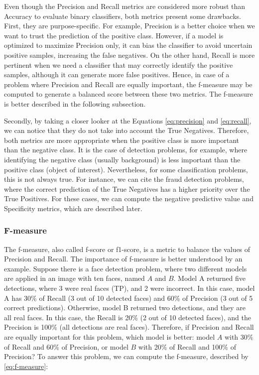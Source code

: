 Even though the Precision and Recall metrics are considered more robust than Accuracy to evaluate binary classifiers, both metrics present some drawbacks. First, they are purpose-specific. For example, Precision is a better choice when we want to trust the prediction of the positive class. However, if a model is optimized to maximize Precision only, it can bias the classifier to avoid uncertain positive samples, increasing the false negatives. On the other hand, Recall is more pertinent when we need a classifier that may correctly identify the positive samples, although it can generate more false positives. Hence, in case of a problem where Precision and Recall are equally important, the f-measure may be computed to generate a balanced score between these two metrics. The f-measure is better described in the following subsection.

Secondly, by taking a closer looker at the Equations \ref{eq:precision} and \ref{eq:recall}, we can notice that they do not take into account the True Negatives. Therefore, both metrics are more appropriate when the positive class is more important than the negative class. It is the case of detection problems, for example, where identifying the negative class (usually background) is less important than the positive class (object of interest). Nevertheless, for some classification problems, this is not always true. For instance, we can cite the fraud detection problems, where the correct prediction of the True Negatives has a higher priority over the True Positives. For these cases, we can compute the negative predictive value and Specificity metrics, which are described later.

\subsubsection{F-measure}

The f-measure, also called f-score or f1-score, is a metric to balance the values of Precision and Recall. The importance of f-measure is better understood by an example. Suppose there is a face detection problem, where two different models are applied in an image with ten faces, named $A$ and $B$. Model A returned five detections, where 3 were real faces (TP), and 2 were incorrect. In this case, model A has 30\% of Recall (3 out of 10 detected faces) and 60\% of Precision (3 out of 5 correct predictions). Otherwise, model B returned two detections, and they are all real faces. In this case, the Recall is 20\% (2 out of 10 detected faces), and the Precision is 100\% (all detections are real faces). Therefore, if Precision and Recall are equally important for this problem, which model is better: model $A$ with 30\% of Recall and 60\% of Precision, or model $B$ with 20\% of Recall and 100\% of Precision? To answer this problem, we can compute the f-measure, described by \autoref{eq:f-measure}: 

